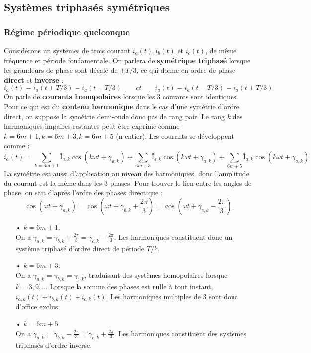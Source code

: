 	\subsection{Systèmes triphasés symétriques}
		\subsubsection{Régime périodique quelconque}
			Considérons un systèmes de trois courant $i_a(t), i_b(t)$ et $i_c(t)$, de même fréquence et période fondamentale. On parlera de \textbf{symétrique triphasé} lorsque les grandeurs de phase sont décalé de $\pm T/3$, ce qui donne en ordre de phase \textbf{direct} et \textbf{inverse} :
			\begin{equation}
				i_a(t) = i_a(t+T/3) = i_a(t-T/3) \qquad et \qquad i_a(t) = i_a(t-T/3) = i_a(t+T/3)
			\end{equation}
			On parle de \textbf{courants homopolaires} lorsque les 3 courants sont identiques. Pour ce qui est du \textbf{contenu harmonique} dans le cas d'une symétrie d'ordre direct, on suppose la symétrie demi-onde donc pas de rang pair. Le rang $k$ des harmoniques impaires restantes peut être exprimé comme $k = 6m+1, k = 6m +3, k= 6m+5$ (n entier). Les courants se développent comme : 
			\begin{equation}
				i_a(t) = \sum _{k = 6m+1}Î_{a,k} \cos (k\omega t + \gamma _{a,k})+ \sum _{6m+3}Î_{a,k} \cos (k\omega t + \gamma _{a,k}) + \sum _{6m+5}Î_{a,k} \cos (k\omega t + \gamma _{a,k})
			\end{equation}
			La symétrie est aussi d'application au niveau des harmoniques, donc l'amplitude du courant est la même dans les 3 phases. Pour trouver le lien entre les angles de phase, on sait d'après l'ordre des phases direct que :
			\begin{equation}
				\cos (\omega t + \gamma _{a,k}) = \cos (\omega t + \gamma _{b,k} + \frac{2\pi}{3}) = \cos (\omega t + \gamma _{c,k} - \frac{2\pi}{3}). 
			\end{equation}
			\begin{itemize}
				\item[•] $k = 6m+1 :$\\
				On a $\gamma _{a,k} = \gamma _{b,k} + \frac{2\pi}{3} = \gamma _{c,k} - \frac{2\pi}{3}$. Les harmoniques constituent donc un système triphasé d'ordre direct de période $T/k$. 
				\item[•] $ k = 6m+3 :$\\
				On a $\gamma _{a,k} = \gamma _{b,k} = \gamma _{c,k}$, traduisant des systèmes homopolaires lorsque $k = 3, 9, ...$ Lorsque la somme des phases est nulle à tout instant, $i_{a,k}(t)+i_{b,k}(t)+i_{c,k}(t)$. Les harmoniques multiples de 3 sont donc d'office exclus. 
				\item[•] $k = 6m+5$\\
				 On a $\gamma _{a,k} = \gamma _{b,k} -\frac{2\pi}{3} =\gamma _{c,k}+\frac{2\pi}{3}$. Les harmoniques constituent des systèmes triphasés d'ordre inverse. 
				 \newpage
			\end{itemize}
			
